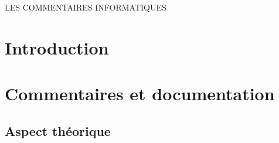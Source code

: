 \documentclass[10pt,a4paper,twoside, openany]{report}
\begin{document}
\begin{titlepage}
\begin{LARGE}
LES COMMENTAIRES INFORMATIQUES
\end{LARGE}
\end{titlepage}

\chapter*{Introduction}

\paragraph{}

\chapter{Commentaires et documentation}

\section{Aspect th\'eorique}

\paragraph{}
\end{document}
